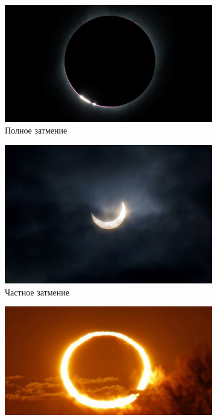 \documentclass{article}
\begin{document}
    \begin{figure}[p] 
    \centering 
    \begin{subfigure}[b]{0.45\textwidth} 
    	\includegraphics[width = \textwidth]{img/5}  
    	\caption{Полное затмение} 
    \end{subfigure} 
    \begin{subfigure}[b]{0.38\textwidth} 
    	\includegraphics[width = \textwidth]{img/4} 
    	\caption{Частное затмение} 
    \end{subfigure} 
    \begin{subfigure}[b]{0.45\textwidth} 								\includegraphics[width = \textwidth]{img/3} 

\end{subfigure}
\end{figure}
\end{document}
